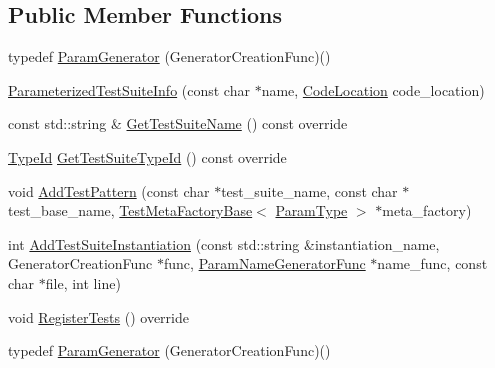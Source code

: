 \subsection*{Public Member Functions}
\begin{DoxyCompactItemize}
\item 
typedef \mbox{\hyperlink{classtesting_1_1internal_1_1_parameterized_test_suite_info_ac6230057c507d74e373233edbf0410c2}{Param\+Generator}} (Generator\+Creation\+Func)()
\item 
\mbox{\hyperlink{classtesting_1_1internal_1_1_parameterized_test_suite_info_a56fc02ddec2cf2101332d1125e4c75a9}{Parameterized\+Test\+Suite\+Info}} (const char $\ast$name, \mbox{\hyperlink{structtesting_1_1internal_1_1_code_location}{Code\+Location}} code\+\_\+location)
\item 
const std\+::string \& \mbox{\hyperlink{classtesting_1_1internal_1_1_parameterized_test_suite_info_a4a5ddc2cd0404438c2b4d405cd0e706c}{Get\+Test\+Suite\+Name}} () const override
\item 
\mbox{\hyperlink{namespacetesting_1_1internal_a38c435cbab5f8b784e2e7f3356cab242}{Type\+Id}} \mbox{\hyperlink{classtesting_1_1internal_1_1_parameterized_test_suite_info_af488d1d7c1889a250acff2ea6eba4c84}{Get\+Test\+Suite\+Type\+Id}} () const override
\item 
void \mbox{\hyperlink{classtesting_1_1internal_1_1_parameterized_test_suite_info_a07445ac68713383f38747e1c56c6a04a}{Add\+Test\+Pattern}} (const char $\ast$test\+\_\+suite\+\_\+name, const char $\ast$test\+\_\+base\+\_\+name, \mbox{\hyperlink{classtesting_1_1internal_1_1_test_meta_factory_base}{Test\+Meta\+Factory\+Base}}$<$ \mbox{\hyperlink{classtesting_1_1internal_1_1_parameterized_test_suite_info_a10761bd750a6820a8d8d2c654b10fe54}{Param\+Type}} $>$ $\ast$meta\+\_\+factory)
\item 
int \mbox{\hyperlink{classtesting_1_1internal_1_1_parameterized_test_suite_info_a174f164f38e522a3935da911a9c1e450}{Add\+Test\+Suite\+Instantiation}} (const std\+::string \&instantiation\+\_\+name, Generator\+Creation\+Func $\ast$func, \mbox{\hyperlink{classtesting_1_1internal_1_1_parameterized_test_suite_info_a3b4f232b7d6d3df941bb8e81b6b534a4}{Param\+Name\+Generator\+Func}} $\ast$name\+\_\+func, const char $\ast$file, int line)
\item 
void \mbox{\hyperlink{classtesting_1_1internal_1_1_parameterized_test_suite_info_a8c0af866d3c291a63d3f4581ccd452d1}{Register\+Tests}} () override
\item 
typedef \mbox{\hyperlink{classtesting_1_1internal_1_1_parameterized_test_suite_info_ac6230057c507d74e373233edbf0410c2}{Param\+Generator}} (Generator\+Creation\+Func)()

\end{DoxyCompactItemize}
